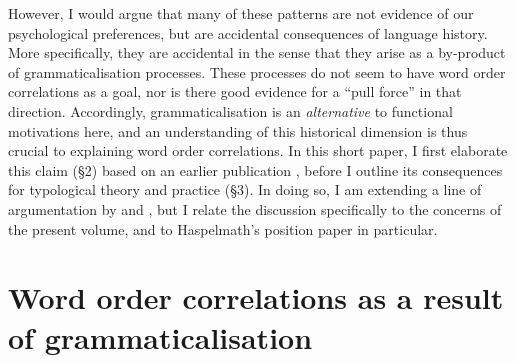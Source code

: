 \documentclass[output=paper]{langsci/langscibook}
\begin{document}
However, I would argue that many of these patterns are not evidence of our psychological preferences, but are accidental consequences of language history. More specifically, they are accidental in the sense that they arise as a by-product of grammaticalisation processes. These processes do not seem to have word order correlations as a goal, nor is there good evidence for a “pull force” in that direction. Accordingly, grammaticalisation is an \textit{alternative} to functional motivations here, and an understanding of this historical dimension is thus crucial to explaining word order correlations. In this short paper, I first elaborate this claim (§2) based on an earlier publication \citep{Collins2012}, before I outline its consequences for typological theory and practice (§3). In doing so, I am extending a line of argumentation by \citet{Givón1971} and \citet{Aristar1991}, but I relate the discussion specifically to the concerns of the present volume, and to Haspelmath’s position paper in particular.

\section{Word order correlations as a result of grammaticalisation}
\end{document}
